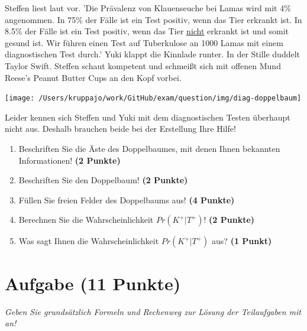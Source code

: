 \documentclass[a4paper, 9pt]{scrartcl}\usepackage[]{graphicx}\usepackage[]{xcolor}
\begin{document}
Steffen liest laut vor. 'Die Prävalenz von Klauenseuche bei Lamas wird mit 4\% angenommen. In 75\% der Fälle ist ein Test positiv, wenn das Tier erkrankt ist. In 8.5\% der Fälle ist ein Test positiv, wenn das Tier \underline{nicht} erkrankt ist und somit gesund ist. Wir führen einen Test auf Tuberkulose an 1000 Lamas mit einem diagnostischen Test durch.' Yuki klappt die Kinnlade runter. In der Stille duddelt Taylor Swift. Steffen schaut kompetent und schmeißt sich mit offenen Mund Reese's Peanut Butter Cups an den Kopf vorbei.

\begin{center}
  \texttt{[image: /Users/kruppajo/work/GitHub/exam/question/img/diag-doppelbaum]}
\end{center}

Leider kennen sich Steffen und Yuki mit dem diagnostischen Testen überhaupt nicht aus. Deshalb brauchen beide bei der Erstellung Ihre Hilfe! 
    
\begin{enumerate}
\item Beschriften Sie die Äste des Doppelbaumes, mit denen Ihnen bekannten Informationen! \textbf{(2 Punkte)}
\item Beschriften Sie den Doppelbaum! \textbf{(2 Punkte)}
\item Füllen Sie freien Felder des Doppelbaums aus! \textbf{(4 Punkte)}
\item Berechnen Sie die Wahrscheinlichkeit $Pr(K^+|T^+)$! \textbf{(2 Punkte)}
\item Was sagt Ihnen die Wahrscheinlichkeit $Pr(K^+|T^+)$ aus? \textbf{(1 Punkt)}
\end{enumerate}






 
\clearpage

\section{Aufgabe \hfill (11 Punkte)}

\textit{Geben Sie grundsätzlich Formeln und Rechenweg zur Lösung der Teilaufgaben mit an!} \\[1Ex]
 
\end{document}
